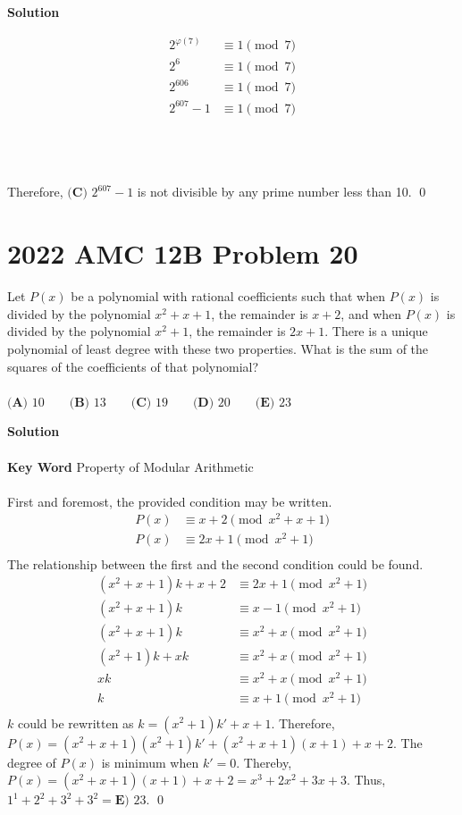 \documentclass{article}
\newenvironment{solution}{\begin{trivlist}\item[]{\bf Solution}}{\qed \end{trivlist}}
\begin{document}
\begin{solution}
\begin{minipage}{0.33333333\textwidth}
\begin{align*}
    2^{\varphi(7)}&\equiv1 \pmod{7} \\
    2^{6}&\equiv1 \pmod{7} \\
    2^{606}&\equiv1 \pmod{7} \\
    2^{607}-1&\equiv1 \pmod{7}
\end{align*}
\end{minipage}
\\\\\\
Therefore, $\boxed{\textbf{(C) } 2^{607}-1}$ is not divisible by any prime number less than 10.
\end{solution}

\newpage
\section*{2022 AMC 12B Problem 20}
Let $P(x)$ be a polynomial with rational coefficients such that when $P(x)$ is divided by the polynomial $x^2 + x + 1$, the remainder is $x + 2$, and when $P(x)$ is divided by the polynomial $x^2 + 1$, the remainder is $2x + 1$. There is a unique polynomial of least degree with these two properties. What is the sum of the squares of the coefficients of that polynomial?
\\\\
$\textbf{(A) } 10 \qquad \textbf{(B) } 13 \qquad \textbf{(C) } 19 \qquad \textbf{(D) } 20 \qquad \textbf{(E) } 23$
\begin{solution}
\\\\
\textbf{Key Word} Property of Modular Arithmetic
\\\\
First and foremost, the provided condition may be written.
\begin{align*}
    P(x)&\equiv x+2 \pmod{x^2+x+1} \\
    P(x)&\equiv 2x+1 \pmod{x^2+1} \\
\end{align*}
The relationship between the first and the second condition could be found.
\begin{align*}
    (x^2+x+1)k+x+2&\equiv2x+1\pmod{x^2+1} \\
    (x^2+x+1)k&\equiv x-1\pmod{x^2+1} \\
    (x^2+x+1)k&\equiv x^2+x\pmod{x^2+1} \\
    (x^2+1)k+xk&\equiv x^2+x \pmod{x^2+1} \\
    xk&\equiv x^2+x \pmod{x^2+1} \\
    k&\equiv x+1 \pmod{x^2+1} \\
\end{align*}
$k$ could be rewritten as $k=(x^2+1)k'+x+1$. Therefore, $P(x)=(x^2+x+1)(x^2+1)k'+(x^2+x+1)(x+1)+x+2$. The degree of $P(x)$ is minimum when $k'=0$. Thereby, $P(x)=(x^2+x+1)(x+1)+x+2=x^3+2x^2+3x+3$. Thus, $1^1+2^2+3^2+3^2=\boxed{\textbf{E) }23}$.
\end{solution}
\end{document}
